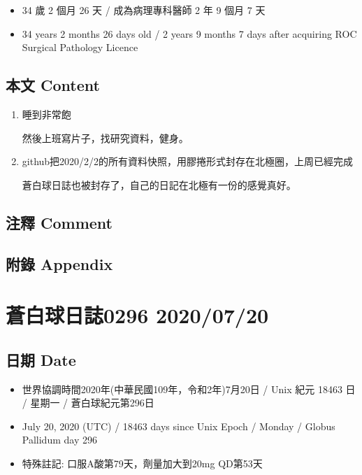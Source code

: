 \documentclass[
]{article}
\providecommand{\tightlist}{%
  \setlength{\itemsep}{0pt}\setlength{\parskip}{0pt}}
\begin{document}
\begin{itemize}
\tightlist
\item
  34 歲 2 個月 26 天 / 成為病理專科醫師 2 年 9 個月 7 天
\item
  34 years 2 months 26 days old / 2 years 9 months 7 days after
  acquiring ROC Surgical Pathology Licence
\end{itemize}

\hypertarget{ux672cux6587-content-18}{%
\subsection{本文 Content}\label{ux672cux6587-content-18}}

\begin{enumerate}
\def\labelenumi{\arabic{enumi}.}
\item
  睡到非常飽

  然後上班寫片子，找研究資料，健身。
\item
  github把2020/2/2的所有資料快照，用膠捲形式封存在北極圈，上周已經完成

  蒼白球日誌也被封存了，自己的日記在北極有一份的感覺真好。
\end{enumerate}

\hypertarget{ux6ce8ux91cb-comment-18}{%
\subsection{注釋 Comment}\label{ux6ce8ux91cb-comment-18}}

\hypertarget{ux9644ux9304-appendix-18}{%
\subsection{附錄 Appendix}\label{ux9644ux9304-appendix-18}}

\hypertarget{ux84bcux767dux7403ux65e5ux8a8c0296-20200720}{%
\section{蒼白球日誌0296
2020/07/20}\label{ux84bcux767dux7403ux65e5ux8a8c0296-20200720}}

\hypertarget{ux65e5ux671f-date-19}{%
\subsection{日期 Date}\label{ux65e5ux671f-date-19}}

\begin{itemize}
\tightlist
\item
  世界協調時間2020年(中華民國109年，令和2年)7月20日 / Unix 紀元 18463 日
  / 星期一 / 蒼白球紀元第296日
\item
  July 20, 2020 (UTC) / 18463 days since Unix Epoch / Monday / Globus
  Pallidum day 296
\item
  特殊註記: 口服A酸第79天，劑量加大到20mg QD第53天
\end{itemize}
\end{document}
